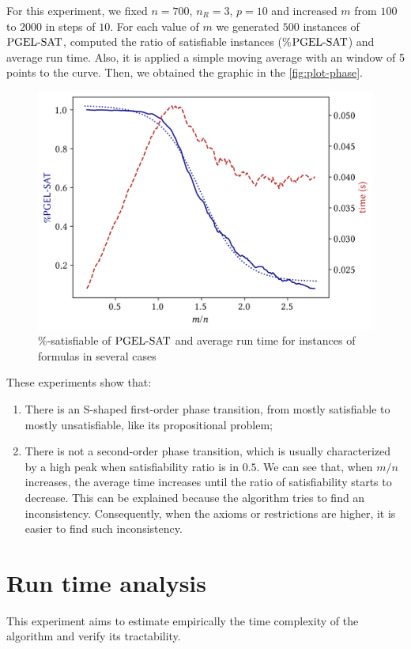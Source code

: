 For this experiment, we fixed $n = 700$, $n_R = 3$, $p = 10$ and increased $m$ from $100$ to $2000$ in steps of $10$. For each value of $m$ we generated $500$ instances of $\text{PGEL-SAT}$, computed the ratio of satisfiable instances (\%$\text{PGEL-SAT}$) and average run time. Also, it is applied a simple moving average with an window of 5 points to the curve.  Then, we obtained the graphic in the \autoref{fig:plot-phase}.

\begin{figure}[ht]
  \centering
  \includegraphics[width=.75\textwidth]{../img/plot-phase-trans}
  \caption{\%-satisfiable of $\text{PGEL-SAT}$ and average run time for instances of formulas in several cases}
  \label{fig:plot-phase}
\end{figure}
  

These experiments show that:
\begin{enumerate}[label=(\alph*)]
	\item There is an S-shaped first-order phase transition, from mostly satisfiable to mostly unsatisfiable, like its propositional problem;
	\item There is not a second-order phase transition, which is usually characterized by a high peak when satisfiability ratio is in $0.5$. We can see that, when $m/n$ increases, the average time increases until the ratio of satisfiability starts to decrease. This can be explained because the algorithm tries to find an inconsistency. Consequently, when the axioms or restrictions are higher, it is easier to find such inconsistency.
\end{enumerate}

\section{Run time analysis}

This experiment aims to estimate empirically the time complexity of the algorithm and verify its tractability.

